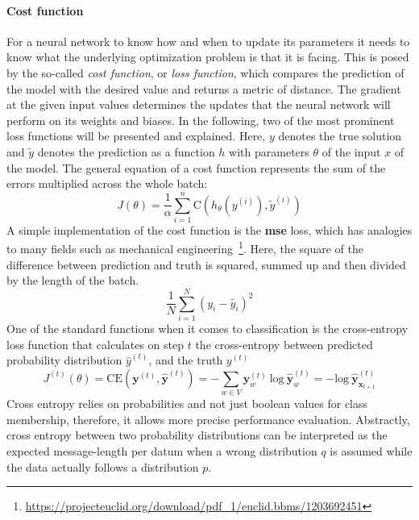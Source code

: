 \paragraph{Cost function}\label{par:cost_function}
For a neural network to know how and when to update its parameters it needs to know what the underlying optimization problem is that it is facing. This is posed by the so-called \textit{cost function}, or \textit{loss function}, which compares the prediction of the model with the desired value and returns a metric of distance. The gradient at the given input values determines the updates that the neural network will perform on its weights and biases. In the following, two of the most prominent loss functions will be presented and explained. Here, $ y $ denotes the true solution and $ \widetilde{y} $ denotes the prediction as a function $ h $ with parameters $ \theta $ of the input $ x $ of the model. The general equation of a cost function represents the sum of the errors multiplied across the whole batch:
\begin{equation}
	J(\theta) = \frac{1}{\alpha} \sum_{i=1}^{n} \text{C} (h_{\theta} (y^{(i)}), \widetilde{y}^{(i)})
\end{equation}
A simple implementation of the cost function is the \textbf{\gls{mse}} loss, which has analogies to many fields such as mechanical engineering~\footnote{\url{https://projecteuclid.org/download/pdf_1/euclid.bbms/1203692451}}. Here, the square of the difference between prediction and truth is squared, summed up and then divided by the length of the batch.
\begin{equation}
	\frac{1}{N} \sum_{i=1}^{N} \left( y_i - \widetilde{y_i} \right)^2
\end{equation}
One of the standard functions when it comes to classification is the cross-entropy loss function that calculates on step $ t $ the cross-entropy between predicted probability distribution $ \hat{y}^{(t)} $, and the truth $ y^{(t)} $
\begin{equation}
	J^{(t)}(\theta) = \text{CE}(\boldsymbol{y}^{(t)}, \hat{\boldsymbol{y}}^{(t)}) = - \sum_{w \in V} \boldsymbol{y}_w^{(t)} \ \text{log} \ \hat{\boldsymbol{y}}_w^{(t)} = - \text{log} \ \hat{\boldsymbol{y}}_{\boldsymbol{x}_{t+1}}^{(t)}
\end{equation}
Cross entropy relies on probabilities and not just boolean values for class membership, therefore, it allows more precise performance evaluation. Abstractly, cross entropy between two probability distributions can be interpreted as the expected message-length per datum when a wrong distribution $ q $ is assumed while the data actually follows a distribution $ p $.

